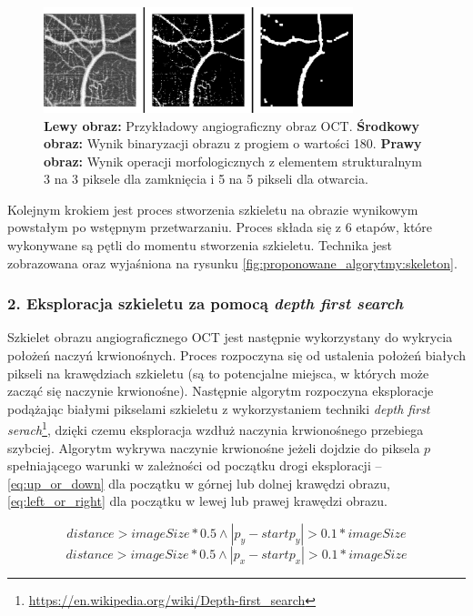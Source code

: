 \begin{figure}[H]
  \centering
  \includegraphics[width=9cm]{gfx/preprocess}
  \caption{\textbf{Lewy obraz:} Przykładowy angiograficzny obraz OCT. \textbf{Środkowy obraz:} Wynik binaryzacji obrazu z progiem o wartości 180. \textbf{Prawy obraz:} Wynik operacji morfologicznych z elementem strukturalnym 3 na 3 piksele dla zamknięcia i 5 na 5 pikseli dla otwarcia.}
  \label{fig:proponowane_algorytmy:preprocess}
\end{figure}

Kolejnym krokiem jest proces stworzenia szkieletu na obrazie wynikowym powstałym po wstępnym przetwarzaniu. Proces składa się z 6 etapów, które wykonywane są pętli do momentu stworzenia szkieletu. Technika jest zobrazowana oraz wyjaśniona na rysunku \ref{fig:proponowane_algorytmy:skeleton}.

\subsubsection{2. Eksploracja szkieletu za pomocą \textit{depth first search}}

Szkielet obrazu angiograficznego OCT jest następnie wykorzystany do wykrycia położeń naczyń krwionośnych. Proces rozpoczyna się od ustalenia położeń białych pikseli na krawędziach szkieletu (są to potencjalne miejsca, w których może zacząć się naczynie krwionośne). Następnie algorytm rozpoczyna eksploracje podążając białymi pikselami szkieletu z wykorzystaniem techniki \textit{depth first serach}\footnote{\url{https://en.wikipedia.org/wiki/Depth-first_search}}, dzięki czemu eksploracja wzdłuż naczynia krwionośnego przebiega szybciej. Algorytm wykrywa naczynie krwionośne jeżeli dojdzie do piksela $p$ spełniającego warunki w zależności od początku drogi eksploracji -- \ref{eq:up_or_down} dla początku w górnej lub dolnej krawędzi obrazu, \ref{eq:left_or_right} dla początku w lewej lub prawej krawędzi obrazu.

\begin{equation}
distance > imageSize * 0.5 \wedge \left|p_{y} - startp_{y}\right| > 0.1 * imageSize
\label{eq:up_or_down}
\end{equation}
\begin{equation}
distance > imageSize * 0.5 \wedge \left|p_{x} - startp_{x}\right| > 0.1 * imageSize
\label{eq:left_or_right}
\end{equation}

